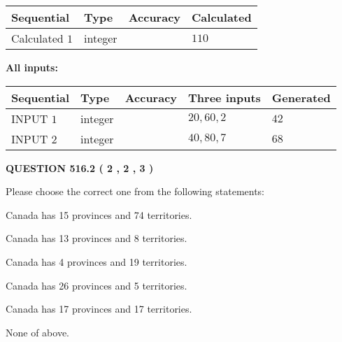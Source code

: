 \documentclass[12pt]{article}
\begin{document}
   
   
   
\noindent{}
   
   
  
  
\noindent\begin{tabular}{|l|l|l|l|}
\hline
 Sequential & Type & Accuracy & Calculated \\ 
\hline
 
 
  Calculated $  1 $ & integer &  & 
  $ 110 $ 
 \\  \hline  
 \end{tabular}
   
   
   
   
\noindent\vspace{0.1in}\hspace{-0.08in} {\textbf{\Large{All inputs: }}}
   
   
  
  
\noindent\begin{tabular}{|l|l|l|l|l|}
\hline
 Sequential & Type & Accuracy & Three inputs & Generated \\ 
\hline
 
 
  INPUT $  1 $ & integer &  & $
 20
 , 
 60
 , 
 2
 $ & $ 42 $ 
 \\  \hline  
 
 
  INPUT $  2 $ & integer &  & $
 40
 , 
 80
 , 
 7
 $ & $ 68 $ 
 \\  \hline  
 \end{tabular}
   
   
  
\vspace{0.2in}
  
{\textbf{\Large{QUESTION
516.2 
 ( 2 , 2 , 3 )
}}}
  
  
Please choose the correct one from the following statements:
 
 
Canada has  15 provinces and  74 territories.
 
 
Canada has  13 provinces and  8 territories.
 
 
Canada has   4 provinces and  19 territories.
 
 
Canada has  26 provinces and  5 territories.
 
 
Canada has  17 provinces and  17 territories.
 
 
 None of above.
 
\end{document}
